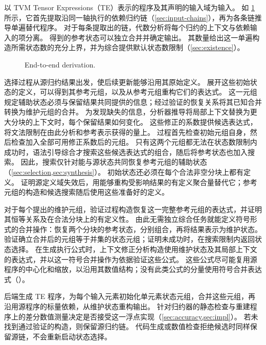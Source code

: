 \sys 以 TVM Tensor Expressions（TE）表示的程序及其声明的输入域为输入。
如 \cref{fig:pipeline} 所示，它首先提取沿同一轴执行的依赖归约链（\cref{sec:input-chains}），再为各条链推导单遍替代程序。
对于每条提取出的链，代数分析将每个归约的上下文与依赖输入的项分离。
得到的参考状态可以独立合并并确定输出。
其数量给出这一单遍构造所需状态数的充分上界，并为综合提供默认状态数限制（\cref{sec:existence}）。

\begin{figure}
\centering

\caption{End-to-end derivation.}
\label{fig:pipeline}
\end{figure}
选择过程从源归约结果出发，使后续更新能够沿用其原始定义。
展开这些初始状态的定义，可以得到其参考元组，以及从参考元组重构它们的表达式。
这一元组规定辅助状态必须与保留结果共同提供的信息；经过验证的恢复关系将其已知合并转换为维护元组的合并。
为发现缺失的信息，分析器推导将局部上下文替换为更大分块的上下文时，每个保留结果如何变化。
这些修正的系数提供候选表达式，将文法限制在由此分析和参考表示获得的量上。
过程首先检查初始元组自身，然后检查加入全部可用修正系数后的元组。
只有这两个元组都无法在状态数限制内成功时，语法引导综合才搜索这些候选表达式的组合，随后将参考状态也加入搜索。
因此，搜索仅针对能与源状态共同恢复参考元组的辅助状态（\cref{sec:selection,sec:synthesis}）。
初始状态还必须在每个合法非空分块上都有定义。
证明源定义域失效后，用能够重构受影响结果的有定义聚合量替代它；参考元组的构造和候选搜索随后使用这些准备好的定义。

对于每个提出的维护元组，验证过程构造恢复这一完整参考元组的表达式，并证明其恒等关系及在合法分块上的有定义性。
由此无需独立综合任务就能定义符号形式的合并操作：恢复两个分块的参考状态，分别组合，再将结果表示为维护状态。
验证确立合并后的元组等于并集的状态元组；证明未成功时，在搜索限制内返回状态选择。
在生成执行公式时，上下文修正分析构造使用维护状态及其局部上下文的表达式，并以这一符号合并操作为依据验证这些公式。
这些公式尽可能复用源程序的中心化和缩放，以沿用其数值结构；没有此类公式的分量使用符号合并表达式（）。

后端生成 TE 程序，为每个输入元素初始化单元素状态元组，合并这些元组，再沿用源程序的标量依赖，从维护状态重构输出。
针对归约器的静态检查与重建程序上的差分数值测量决定是否接受这一浮点实现（\cref{sec:accuracy,sec:impl}）。
若未找到通过验证的构造，则保留源归约链。
代码生成或数值检查拒绝候选时同样保留源链，不会重新启动状态选择。
